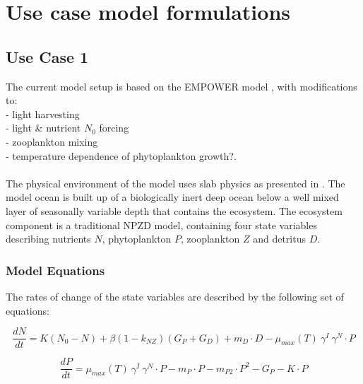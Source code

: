 \documentclass[template.tex]{subfiles}
\begin{document}
\section{Use case model formulations}
%
%
%
%
%
%

\subsection{Use Case 1}
The current model setup is based on the EMPOWER model \citep{Anderson2015c}, with modifications to:\\ 
- light harvesting\\ 
- light & nutrient $N_0$ forcing\\ 
- zooplankton mixing\\ 
- temperature dependence of phytoplankton growth?.\\ 

\\ 
The physical environment of the model uses slab physics as presented in \citet{Evans1985ACycles}. The model ocean is built up of a biologically inert deep ocean below a well mixed layer of seasonally variable depth that contains the ecosystem. The ecosystem component is a traditional NPZD model, containing four state variables describing nutrients $N$, phytoplankton $P$, zooplankton $Z$ and detritus $D$.
\subsubsection{Model Equations}
The rates of change of the state variables are described by the following set of equations:

\begin{equation}
    \frac{d N}{d t} = 
    K (N_0 - N) %
    + \beta(1 - k_{NZ})(G_P + G_D) %
    + m_D \cdot D %
    - \mu_{max}(T) \  \gamma^{I} \ \gamma^{N} \cdot P %
\end{equation}

\begin{equation}
    \frac{d P}{d t} =
    \mu_{max}(T) \  \gamma^{I} \ \gamma^{N} \cdot P  %
    - m_P \cdot P %
    - m_{P2} \cdot P^2 %
    - G_P %
    - K \cdot P %
\end{equation}
\end{document}
